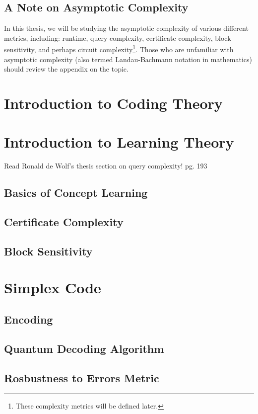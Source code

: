 \documentclass[12pt,twoside]{reedthesis}
\begin{document}
\section{A Note on Asymptotic Complexity}

In this thesis, we will be studying the asymptotic complexity of various different metrics, including: runtime, query complexity, certificate complexity, block sensitivity, and perhaps circuit complexity\footnote{These complexity metrics will be defined later.}. Those who are unfamiliar with asymptotic complexity (also termed Landau-Bachmann notation in mathematics) should review the appendix on the topic. 


\chapter{Introduction to Coding Theory}	


\chapter{Introduction to Learning Theory}
Read Ronald de Wolf's thesis section on query complexity! pg. 193
\section{Basics of Concept Learning}
\section{Certificate Complexity}
\section{Block Sensitivity}

\chapter{Simplex Code}
\section{Encoding}
\section{Quantum Decoding Algorithm}
\section{Rosbustness to Errors Metric}
\end{document}
